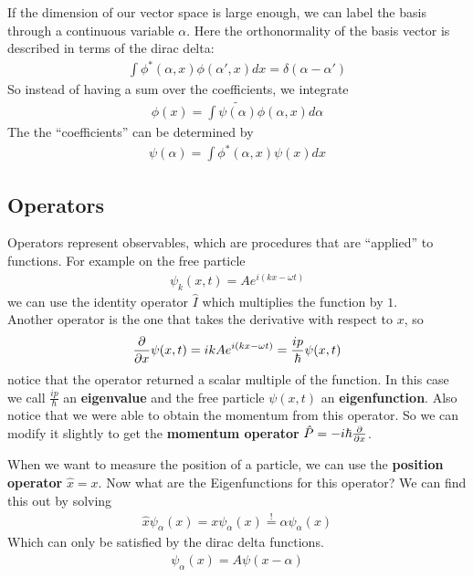 If the dimension of our vector space is large enough, we can label the basis through a continuous variable $\alpha$. 
Here the orthonormality of the basis vector is described in terms of the dirac delta:
\begin{align*}
	\int \phi^*(\alpha,x) \phi(\alpha',x) dx = \delta(\alpha - \alpha')
\end{align*}
So instead of having a sum over the coefficients, we integrate
\begin{align*}
	\phi(x) = \int \tilde{\psi(\alpha)}\phi(\alpha,x)d \alpha
\end{align*}
The the ``coefficients'' can be determined by
\begin{align*}
	\psi(\alpha) = \int \phi^*(\alpha,x) \psi(x) dx
\end{align*}


\subsection{Operators}
Operators represent observables, which are procedures that are ``applied'' to functions. For example on the free particle
\begin{align*}
	\psi_k(x,t) = A e^{i(kx - \omega t)}
\end{align*}
we can use the identity operator $\hat{I}$ which multiplies the function by $1$.\\
Another operator is the one that takes the derivative with respect to $x$, so
\begin{align*}
	\frac{\partial }{\partial x} \psi(x,t) = ik A e^{i(kx - \omega t)} = \frac{i p}{\hbar} \psi(x,t)
\end{align*}
notice that the operator returned a scalar multiple of the function. In this case we call $\frac{ip}{\hbar}$ an \textbf{eigenvalue} and the free particle $\psi(x,t)$ an \textbf{eigenfunction}.
Also notice that we were able to obtain the momentum from this operator. So we can modify it slightly to get the \textbf{momentum operator} $\hat{P} = -i \hbar \frac{\partial }{\partial x}$.

When we want to measure the position of a particle, we can use the \textbf{position operator} $\hat{x} = x$. Now what are the Eigenfunctions for this operator? We can find this out by solving
\begin{align*}
	\hat{x} \psi_{\alpha}(x) = x \psi_{\alpha}(x) \stackrel{!}{=} \alpha \psi_{\alpha}(x)
\end{align*}
Which can only be satisfied by the dirac delta functions.
\begin{align*}
	\psi_{\alpha}(x) = A \psi(x - \alpha)
\end{align*}

